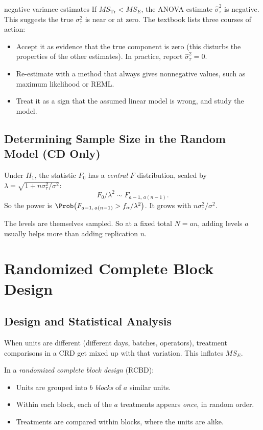 \begin{pitfall}{negative variance estimates}
If $MS_{\mathrm{Tr}}<MS_E$, the ANOVA estimate $\hat\sigma_\tau^2$ is negative. This suggests the true $\sigma_\tau^2$ is near or at zero. The textbook lists three courses of action:
\begin{itemize}
  \item Accept it as evidence that the true component is zero (this disturbs the properties of the other estimates). In practice, report $\hat\sigma_\tau^2=0$.
  \item Re-estimate with a method that always gives nonnegative values, such as maximum likelihood or REML.
  \item Treat it as a sign that the assumed linear model is wrong, and study the model.
\end{itemize}
\end{pitfall}

\subsection{Determining Sample Size in the Random Model (CD Only)}

Under $H_1$, the statistic $F_0$ has a \emph{central} $F$ distribution, scaled by $\lambda=\sqrt{1+n\sigma_\tau^2/\sigma^2}$:
\[ F_0/\lambda^2\sim F_{a-1,\,a(n-1)}. \]
So the power is $\Prob\big(F_{a-1,\,a(n-1)}>f_{\alpha}/\lambda^2\big)$. It grows with $n\sigma_\tau^2/\sigma^2$.

The levels are themselves sampled. So at a fixed total $N=an$, adding levels $a$ usually helps more than adding replication $n$.

\section{Randomized Complete Block Design}\label{sec:rcbd}

\subsection{Design and Statistical Analysis}

When units are different (different days, batches, operators), treatment comparisons in a CRD get mixed up with that variation. This inflates $MS_E$.

In a \emph{randomized complete block design} (RCBD):
\begin{itemize}
  \item Units are grouped into $b$ \emph{blocks} of $a$ similar units.
  \item Within each block, each of the $a$ treatments appears \emph{once}, in random order.
  \item Treatments are compared within blocks, where the units are alike.
\end{itemize}

